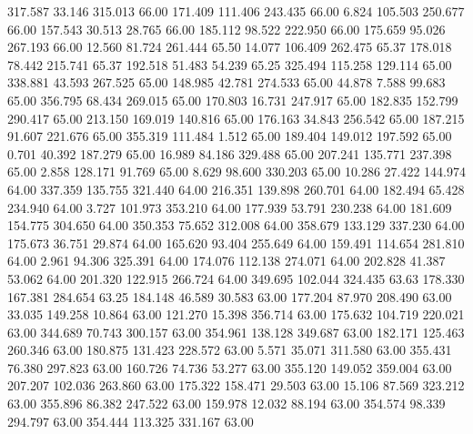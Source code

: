  317.587   33.146  315.013        66.00
 171.409  111.406  243.435        66.00
   6.824  105.503  250.677        66.00
 157.543   30.513   28.765        66.00
 185.112   98.522  222.950        66.00
 175.659   95.026  267.193        66.00
  12.560   81.724  261.444        65.50
  14.077  106.409  262.475        65.37
 178.018   78.442  215.741        65.37
 192.518   51.483   54.239        65.25
 325.494  115.258  129.114        65.00
 338.881   43.593  267.525        65.00
 148.985   42.781  274.533        65.00
  44.878    7.588   99.683        65.00
 356.795   68.434  269.015        65.00
 170.803   16.731  247.917        65.00
 182.835  152.799  290.417        65.00
 213.150  169.019  140.816        65.00
 176.163   34.843  256.542        65.00
 187.215   91.607  221.676        65.00
 355.319  111.484    1.512        65.00
 189.404  149.012  197.592        65.00
   0.701   40.392  187.279        65.00
  16.989   84.186  329.488        65.00
 207.241  135.771  237.398        65.00
   2.858  128.171   91.769        65.00
   8.629   98.600  330.203        65.00
  10.286   27.422  144.974        64.00
 337.359  135.755  321.440        64.00
 216.351  139.898  260.701        64.00
 182.494   65.428  234.940        64.00
   3.727  101.973  353.210        64.00
 177.939   53.791  230.238        64.00
 181.609  154.775  304.650        64.00
 350.353   75.652  312.008        64.00
 358.679  133.129  337.230        64.00
 175.673   36.751   29.874        64.00
 165.620   93.404  255.649        64.00
 159.491  114.654  281.810        64.00
   2.961   94.306  325.391        64.00
 174.076  112.138  274.071        64.00
 202.828   41.387   53.062        64.00
 201.320  122.915  266.724        64.00
 349.695  102.044  324.435        63.63
 178.330  167.381  284.654        63.25
 184.148   46.589   30.583        63.00
 177.204   87.970  208.490        63.00
  33.035  149.258   10.864        63.00
 121.270   15.398  356.714        63.00
 175.632  104.719  220.021        63.00
 344.689   70.743  300.157        63.00
 354.961  138.128  349.687        63.00
 182.171  125.463  260.346        63.00
 180.875  131.423  228.572        63.00
   5.571   35.071  311.580        63.00
 355.431   76.380  297.823        63.00
 160.726   74.736   53.277        63.00
 355.120  149.052  359.004        63.00
 207.207  102.036  263.860        63.00
 175.322  158.471   29.503        63.00
  15.106   87.569  323.212        63.00
 355.896   86.382  247.522        63.00
 159.978   12.032   88.194        63.00
 354.574   98.339  294.797        63.00
 354.444  113.325  331.167        63.00
